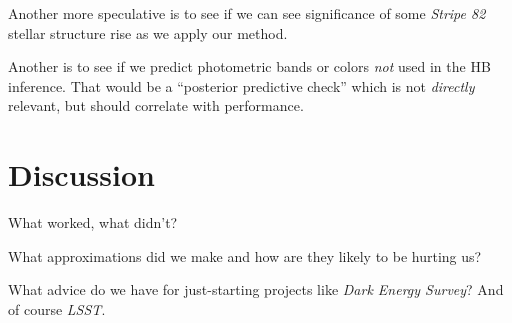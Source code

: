 \documentclass[12pt]{article}
\newcommand{\project}[1]{\textsl{#1}}
\begin{document}
Another more speculative is to see if we can see significance of some
\project{Stripe 82} stellar structure rise as we apply our method.

Another is to see if we predict photometric bands or colors \emph{not}
used in the HB inference.  That would be a ``posterior predictive
check'' which is not \emph{directly} relevant, but should correlate
with performance.

\section{Discussion}

What worked, what didn't?

What approximations did we make and how are they likely to be hurting
us?

What advice do we have for just-starting projects like \project{Dark
  Energy Survey}?  And of course \project{LSST}.
\end{document}
